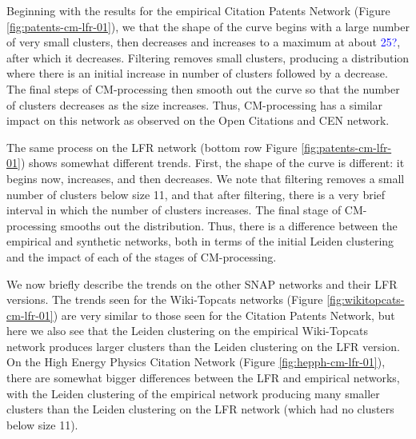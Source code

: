 \documentclass[11pt]{article}   	%
\begin{document}
Beginning with the results for the empirical Citation Patents Network (Figure \ref{fig:patents-cm-lfr-01}), we that the shape of the curve begins with a large number of very small clusters, then decreases and increases to a maximum
at about \textcolor{blue}{25?}, after which it decreases.
Filtering removes small clusters, producing a distribution where there is an initial increase in number of clusters
followed by a decrease.  The final  steps of CM-processing then smooth out the curve so that the number of clusters decreases as the size increases.
Thus, CM-processing has a similar impact on this network as observed on the Open Citations and CEN network.

The same process on the LFR network (bottom row Figure \ref{fig:patents-cm-lfr-01}) shows  somewhat different trends.
First, the shape of the curve is different: it begins now, increases, and then decreases.
We note that filtering removes a small number of clusters below size 11, and that
after filtering, there is a very brief interval in which the number of clusters increases.
The final stage of CM-processing smooths out the distribution.
Thus, there is a difference between the empirical and synthetic networks, both in terms of the initial Leiden clustering and the impact of each of
the stages of CM-processing.

We now briefly describe the trends on the other SNAP networks and their LFR versions.
The trends seen for the Wiki-Topcats networks  (Figure \ref{fig:wikitopcats-cm-lfr-01}) are very similar to those seen for the Citation Patents
Network, but here we also see that the Leiden clustering on the empirical Wiki-Topcats network produces larger clusters than the Leiden clustering on the LFR version.
On the High Energy Physics Citation Network (Figure \ref{fig:hepph-cm-lfr-01}), there are somewhat bigger differences between the LFR and empirical networks, with the Leiden clustering of the empirical network producing many smaller clusters than the Leiden clustering on the LFR network (which had no clusters below size 11).
\end{document}
